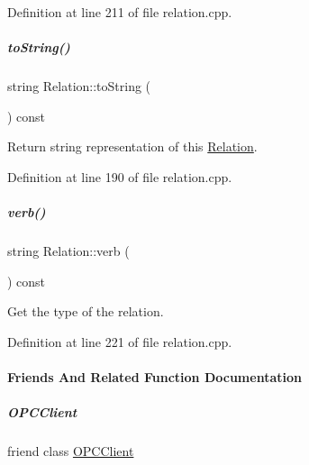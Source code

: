 Definition at line 211 of file relation.\+cpp.

\mbox{\label{group__icubclient__representations_a30f68703dc4a28bc03a79503177f5466}} 
\subparagraph{\texorpdfstring{to\+String()}{toString()}}
{\footnotesize\ttfamily string Relation\+::to\+String (\begin{DoxyParamCaption}{ }\end{DoxyParamCaption}) const\hspace{0.3cm}{\ttfamily [virtual]}}



Return string representation of this \hyperlink{group__icubclient__representations_classicubclient_1_1Relation}{Relation}. 



Definition at line 190 of file relation.\+cpp.

\mbox{\label{group__icubclient__representations_ad20612000c6327a4ee6cb1f7568ccefa}} 
\subparagraph{\texorpdfstring{verb()}{verb()}}
{\footnotesize\ttfamily string Relation\+::verb (\begin{DoxyParamCaption}{ }\end{DoxyParamCaption}) const}



Get the type of the relation. 



Definition at line 221 of file relation.\+cpp.



\paragraph{Friends And Related Function Documentation}
\mbox{\label{group__icubclient__representations_a80f0caa9925206967111a3d2713874a2}} 
\subparagraph{\texorpdfstring{O\+P\+C\+Client}{OPCClient}}
{\footnotesize\ttfamily friend class \hyperlink{group__icubclient__clients_classicubclient_1_1OPCClient}{O\+P\+C\+Client}\hspace{0.3cm}{\ttfamily [friend]}}



